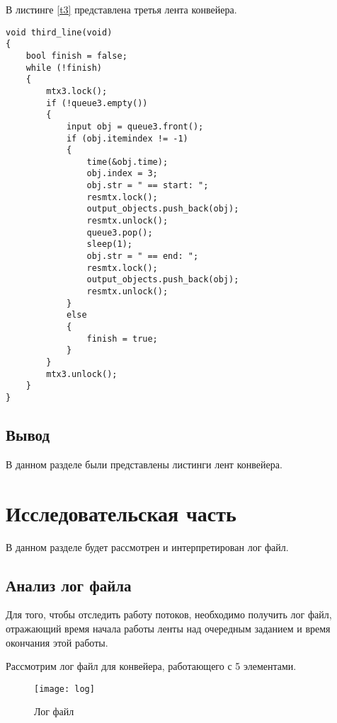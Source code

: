 \documentclass[a4paper, 14pt]{article}
\begin{document}
	\newpage
В листинге \ref{t3} представлена третья лента конвейера.\\

\begin{lstlisting}[label=t3,caption=Третья лента]
void third_line(void)
{
    bool finish = false;
    while (!finish)
    {
        mtx3.lock();
        if (!queue3.empty())
        {
            input obj = queue3.front();
            if (obj.itemindex != -1)
            {
                time(&obj.time);
                obj.index = 3;
                obj.str = " == start: ";
                resmtx.lock();
                output_objects.push_back(obj);
                resmtx.unlock();
                queue3.pop();
                sleep(1);
                obj.str = " == end: ";
                resmtx.lock();
                output_objects.push_back(obj);
                resmtx.unlock();
            }
            else
            {
                finish = true;
            }
        }
        mtx3.unlock();
    }
}
\end{lstlisting}

	\subsection{Вывод}

В данном разделе были представлены листинги лент конвейера.

	\newpage
	\section{Исследовательская часть}
	В данном разделе будет рассмотрен и интерпретирован лог файл.\\

	\subsection{Анализ лог файла}
	
	Для того, чтобы отследить работу потоков, необходимо получить лог файл, отражающий время начала работы ленты над очередным заданием и время окончания этой работы. 
	
	Рассмотрим лог файл для конвейера, работающего с 5 элементами.
	
	\begin{figure}[H]
        	\begin{center}
        		{\texttt{[image: log]}}
        		\caption{Лог файл}
        	\end{center}
        \end{figure}
	
\end{document}
